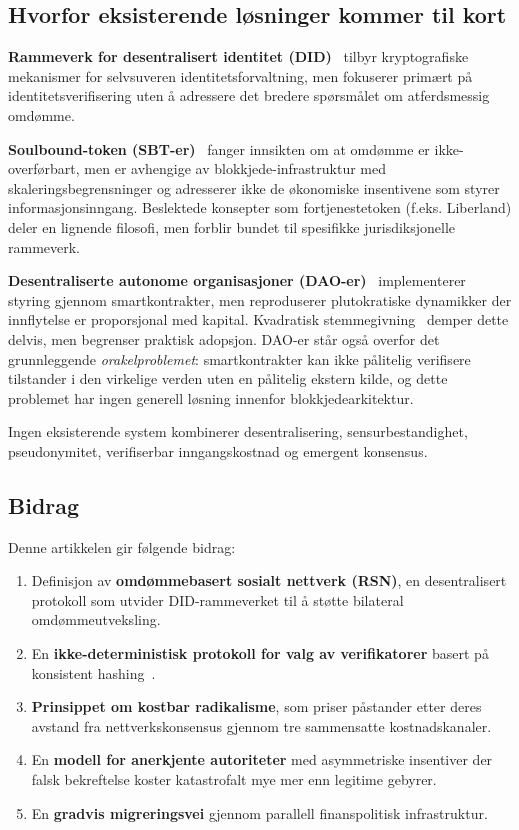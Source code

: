 \documentclass[11pt,a4paper,twocolumn]{article}
\begin{document}
\subsection{Hvorfor eksisterende løsninger kommer til kort}

\textbf{Rammeverk for desentralisert identitet (DID)}~\cite{did2022} tilbyr kryptografiske mekanismer for selvsuveren identitetsforvaltning, men fokuserer primært på identitetsverifisering uten å adressere det bredere spørsmålet om atferdsmessig omdømme.

\textbf{Soulbound-token (SBT-er)}~\cite{weyl2022} fanger innsikten om at omdømme er ikke-overførbart, men er avhengige av blokkjede-infrastruktur med skaleringsbegrensninger og adresserer ikke de økonomiske insentivene som styrer informasjonsinngang. Beslektede konsepter som fortjenestetoken (f.eks. Liberland) deler en lignende filosofi, men forblir bundet til spesifikke jurisdiksjonelle rammeverk.

\textbf{Desentraliserte autonome organisasjoner (DAO-er)}~\cite{buterin2014} implementerer styring gjennom smartkontrakter, men reproduserer plutokratiske dynamikker der innflytelse er proporsjonal med kapital. Kvadratisk stemmegivning~\cite{buterin2019} demper dette delvis, men begrenser praktisk adopsjon. DAO-er står også overfor det grunnleggende \emph{orakelproblemet}: smartkontrakter kan ikke pålitelig verifisere tilstander i den virkelige verden uten en pålitelig ekstern kilde, og dette problemet har ingen generell løsning innenfor blokkjedearkitektur.

Ingen eksisterende system kombinerer desentralisering, sensurbestandighet, pseudonymitet, verifiserbar inngangskostnad og emergent konsensus.

\subsection{Bidrag}

Denne artikkelen gir følgende bidrag:
\begin{enumerate}[nosep]
\item Definisjon av \textbf{omdømmebasert sosialt nettverk (RSN)}, en desentralisert protokoll som utvider DID-rammeverket til å støtte bilateral omdømmeutveksling.
\item En \textbf{ikke-deterministisk protokoll for valg av verifikatorer} basert på konsistent hashing~\cite{karger1997}.
\item \textbf{Prinsippet om kostbar radikalisme}, som priser påstander etter deres avstand fra nettverkskonsensus gjennom tre sammensatte kostnadskanaler.
\item En \textbf{modell for anerkjente autoriteter} med asymmetriske insentiver der falsk bekreftelse koster katastrofalt mye mer enn legitime gebyrer.
\item En \textbf{gradvis migreringsvei} gjennom parallell finanspolitisk infrastruktur.
\end{enumerate}
\end{document}
